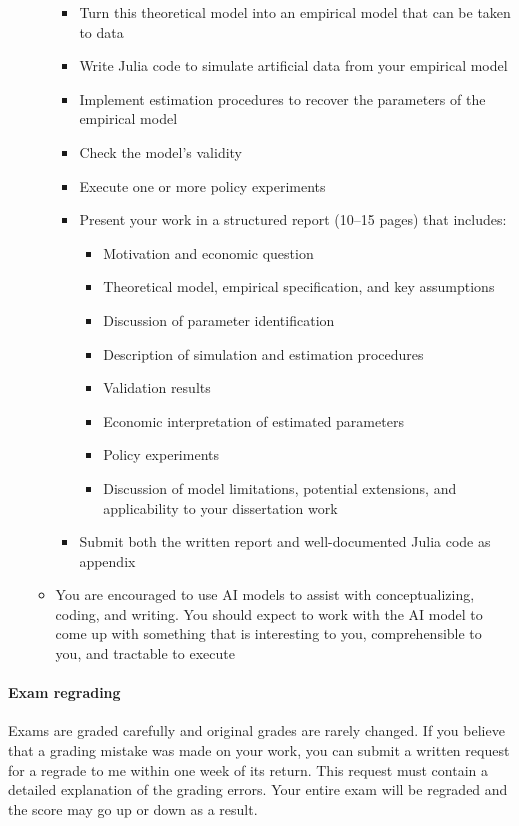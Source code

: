 \documentclass[11pt,english]{article}
\begin{document}
\begin{itemize}
\begin{itemize}
\begin{itemize}
            \item Turn this theoretical model into an empirical model that can be taken to data
            \item Write Julia code to simulate artificial data from your empirical model
            \item Implement estimation procedures to recover the parameters of the empirical model
            \item Check the model's validity
            \item Execute one or more policy experiments
            \item Present your work in a structured report (10--15 pages) that includes:
            \begin{itemize}
                \item Motivation and economic question
                \item Theoretical model, empirical specification, and key assumptions
                \item Discussion of parameter identification
                \item Description of simulation and estimation procedures
                \item Validation results
                \item Economic interpretation of estimated parameters
                \item Policy experiments
                \item Discussion of model limitations, potential extensions, and applicability to your dissertation work
            \end{itemize}
            \item Submit both the written report and well-documented Julia code as appendix
        \end{itemize}
        \item You are encouraged to use AI models to assist with conceptualizing, coding, and writing. You should expect to work with the AI model to come up with something that is interesting to you, comprehensible to you, and tractable to execute
    \end{itemize}
\end{itemize}

\paragraph{Exam regrading}
Exams are graded carefully and original grades are rarely changed. If you believe that a grading mistake was made on your work, you can submit a written request for a regrade to me within one week of its return. This request must contain a detailed explanation of the grading errors. Your entire exam will be regraded and the score may go up or down as a result.
\end{document}
